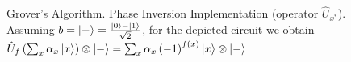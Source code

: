 \begin{figure}
\centering



\caption{Grover's Algorithm. Phase Inversion Implementation (operator
  $\hat{U}_{x^\ast}$). Assuming 
  $b=\ket{-} = \frac{\ket{0} -
    \ket{1}}{\sqrt{2}}$, for the depicted circuit we obtain
$\hat{U}_{f}\left(\sum_x \alpha_x \ket{x}\right)\otimes\ket{-} = 
\sum_x \alpha_x
\left(-1\right)^{f\left(x\right)}\ket{x}\otimes\ket{-}$} 
\label{figQuantCompGroverPhaseInvImpl}
\end{figure}